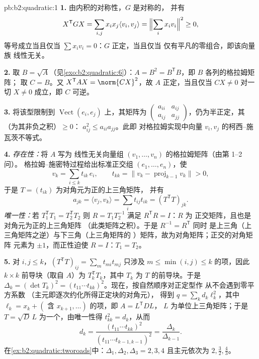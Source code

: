 \begin{solution}{pb:b2:quadratic:1}
\textbf{1.} 由内积的对称性，$G$ 是对称的，
并有
\[
X^{\mathsf T}GX = \sum_{i,j}x_ix_j\langle v_i, v_j\rangle
= \Bigl\|\sum_i x_iv_i\Bigr\|^2 \geq 0 ,
\]
等号成立当且仅当 $\sum x_iv_i = 0$：$G$ 正定，当且仅当
仅有平凡的零组合，即该向量族
线性无关。

\textbf{2.} 取 $B = \sqrt A$（见\cref{exo:b2:quadratic:6}）：$A
= B^2 = B^{\mathsf T}B$，即 $B$ 各列的格拉姆矩阵；
取 $C = B$。又 $X^{\mathsf T}AX = \norm{CX}^2$，故 $A$
正定，当且仅当 $CX \neq 0$ 对一切 $X \neq 0$ 成立，即 $C$ 可逆。

\textbf{3.} 将该型限制到
$\operatorname{Vect}(e_i, e_j)$ 上，其矩阵为
$\begin{pmatrix} a_{ii} & a_{ij}\\ a_{ij} & a_{jj}
\end{pmatrix}$，仍为半正定，其
（为其非负之积）$\geq 0$：
$a_{ij}^2 \leq a_{ii}a_{jj}$。此即
对格拉姆实现中向量 $v_i, v_j$ 的柯西–施瓦茨不等式。

\textbf{4.} \emph{存在性：}将 $A$ 写为
线性无关向量组 $(v_1, \dots, v_n)$ 的格拉姆矩阵（由第 1–2 问）。
格拉姆–施密特过程给出标准正交组 $(e_1, \dots, e_n)$，使
\[
v_k = \sum_{i \leq k} t_{ik}\,e_i,
\qquad t_{kk} = \bigl\| v_k - \operatorname{proj}_{k-1}v_k
\bigr\| > 0 ,
\]
于是 $T = (t_{ik})$ 为对角元为正的上三角矩阵，
并有
\[
a_{jk} = \langle v_j, v_k\rangle
= \sum_i t_{ij}t_{ik} = (T^{\mathsf T}T)_{jk} .
\]
\emph{唯一性：}若 $T_1^{\mathsf T}T_1 = T_2^{\mathsf T}T_2$
则 $R = T_1T_2^{-1}$ 满足 $R^{\mathsf T}R = I$：$R$ 为
正交矩阵，且也是对角元为正的上三角矩阵
（此类矩阵之积）。于是 $R^{-1} = R^{\mathsf T}$ 同时
是上三角（上三角矩阵之逆）与下三角（上三角矩阵的
）矩阵，故为对角矩阵；正交的对角矩阵
元素为 $\pm1$，而正性迫使 $R = I$：$T_1 = T_2$。

\textbf{5.} 对 $i, j \leq k$，$(T^{\mathsf T}T)_{ij} = \sum_m
t_{mi}t_{mj}$ 只涉及 $m \leq \min(i,j) \leq k$ 的项，因此
$k\times k$ 前导块（取自 $A$）为 $T_k^{\mathsf T}T_k$，其中
$T_k$ 为 $T$ 的前导块。于是 $\Delta_k = (\det T_k)^2
= (t_{11}\cdots t_{kk})^2$。现在，按自然顺序对正定型作
从不会遇到零平方系数
（主元即逐次约化所得正定块的对角元），
得到 $q
= \sum_k d_k\ell_k^2$，其中 $\ell_k = x_k + (\text{ 含 }
x_{k+1}, \dots)$ 的项，即 $A = L^{\mathsf T}DL$，
$L$ 为单位上三角矩阵；于是 $T = \sqrt D\,L$ 为一个，由唯一性得 $t_{kk}^2 = d_k$，从而
\[
d_k = \frac{(t_{11}\cdots t_{kk})^2}
{(t_{11}\cdots t_{k-1,k-1})^2}
= \frac{\Delta_k}{\Delta_{k-1}} .
\]
在\cref{ex:b2:quadratic:tworoads}中：$\Delta_1, \Delta_2,
\Delta_3 = 2, 3, 4$ 且主元依次为 $2, \frac32, \frac43$。


\end{solution}
